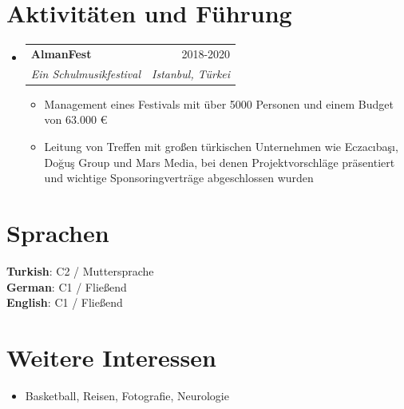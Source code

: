 \documentclass[a4paper,11pt]{article}
\makeatletter
\newcommand{\resumeItem}[1]{
  \item{
    {#1 \vspace{-4pt}}
  }
}
\newcommand{\resumeSubheading}[4]{
  \vspace{-2pt}\item
    \begin{tabular*}{0.97\textwidth}[t]{l@{\extracolsep{\fill}}r}
      \textbf{#1} & #2 \\
      \textit{\small #3} & \textit{\small #4} \\
    \end{tabular*}\vspace{-10pt}
}
\newcommand{\resumeSubHeadingListStart}{\begin{itemize}[leftmargin=0.15in, label={}]}
\newcommand{\resumeSubHeadingListEnd}{\end{itemize}}
\newcommand{\resumeItemListStart}{\begin{itemize}}
\newcommand{\resumeItemListEnd}{\end{itemize}\vspace{-2pt}}
\makeatother
\begin{document}
\section{Aktivitäten und Führung} 
\resumeSubHeadingListStart

\resumeSubheading
        {AlmanFest}{2018-2020}
        {Ein Schulmusikfestival}{Istanbul, Türkei}
      \resumeItemListStart
        \small\resumeItem{Management eines Festivals mit über 5000 Personen und einem Budget von 63.000 €}
        \resumeItem{Leitung von Treffen mit großen türkischen Unternehmen wie Eczacıbaşı, Doğuş Group und Mars Media, bei denen Projektvorschläge präsentiert und wichtige Sponsoringverträge abgeschlossen wurden}
      
    \resumeItemListEnd
\resumeSubHeadingListEnd

\section{Sprachen}
\begin{itemize}[leftmargin=0.15in, label={}]
    \normalsize{\item{
     \textbf{Turkish}{: C2 / Muttersprache} \\
     \textbf{German}{: C1 / Fließend}\\
     \textbf{English}{: C1 / Fließend} \\
    }}
 \end{itemize}

\section{Weitere Interessen}

     \resumeItemListStart
        \normalsize{}\resumeItem{Basketball, Reisen, Fotografie, Neurologie}
        
    \resumeItemListEnd   
 
\end{document}
